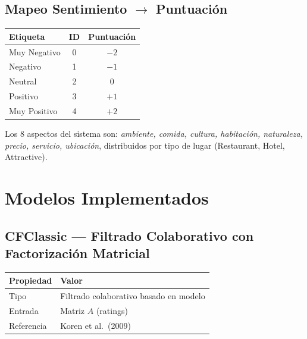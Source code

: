 \documentclass[11pt, a4paper]{article}
\begin{document}
\subsection{Mapeo Sentimiento $\to$ Puntuación}

\begin{table}[H]\centering
\begin{tabular}{lcc}
\toprule
\textbf{Etiqueta} & \textbf{ID} & \textbf{Puntuación} \\
\midrule
Muy Negativo & 0 & $-2$ \\
Negativo     & 1 & $-1$ \\
Neutral      & 2 & $0$ \\
Positivo     & 3 & $+1$ \\
Muy Positivo & 4 & $+2$ \\
\bottomrule
\end{tabular}
\end{table}

Los 8 aspectos del sistema son: \textit{ambiente, comida, cultura, habitación, naturaleza, precio, servicio, ubicación}, distribuidos por tipo de lugar (Restaurant, Hotel, Attractive).


\section{Modelos Implementados}

\subsection{CFClassic --- Filtrado Colaborativo con Factorización Matricial}

\begin{table}[H]\centering
\begin{tabular}{ll}
\toprule
\textbf{Propiedad} & \textbf{Valor} \\
\midrule
Tipo      & Filtrado colaborativo basado en modelo \\
Entrada   & Matriz $A$ (ratings) \\
Referencia & Koren et al.\ (2009) \\
\bottomrule
\end{tabular}
\end{table}
\end{document}
